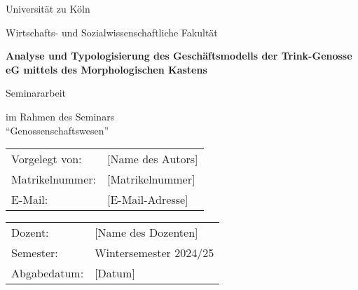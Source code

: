 \begin{titlepage}
\centering

\vspace*{2cm}

{\Large Universität zu Köln}

\vspace{1cm}

{\large Wirtschafts- und Sozialwissenschaftliche Fakultät}

\vspace{2cm}

{\huge\bfseries Analyse und Typologisierung des Geschäftsmodells der Trink-Genosse eG mittels des Morphologischen Kastens}

\vspace{2cm}

{\Large Seminararbeit}

\vspace{1cm}

{\large im Rahmen des Seminars\\
\enquote{Genossenschaftswesen}}

\vspace{3cm}

\begin{tabular}{ll}
Vorgelegt von: & [Name des Autors] \\
Matrikelnummer: & [Matrikelnummer] \\
E-Mail: & [E-Mail-Adresse] \\
\end{tabular}

\vspace{2cm}

\begin{tabular}{ll}
Dozent: & [Name des Dozenten] \\
Semester: & Wintersemester 2024/25 \\
Abgabedatum: & [Datum] \\
\end{tabular}

\end{titlepage}
\newpage
